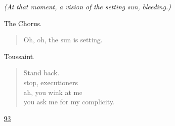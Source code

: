 \documentclass[letterpaper,article,12pt,oneside,notitlepage]{memoir}
\begin{document}
\textit{(At that moment, a vision of the setting sun, bleeding.)}

\begin{center}The Chorus.\end{center}

\begin{verse}
Oh, oh, the sun is setting. \\
\end{verse}

\begin{center}Toussaint.\end{center}

\begin{verse}
Stand back. \\
stop, executioners \\
ah, you wink at me \\
you ask me for my complicity. \\
\end{verse}

\clearpage

\href{http://cesaire.elotroalex.com/chiens/chiens/p093.html}{93}
\end{document}
